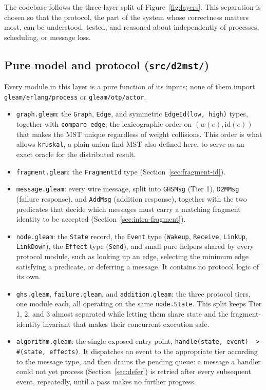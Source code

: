 The codebase follows the three-layer split of Figure~\ref{fig:layers}. This separation is
chosen so that the protocol, the part of the system whose correctness matters most, can be
understood, tested, and reasoned about independently of processes, scheduling, or message
loss.

\subsection{Pure model and protocol (\texttt{src/d2mst/})}

Every module in this layer is a pure function of its inputs; none of them import
\texttt{gleam/erlang/process} or \texttt{gleam/otp/actor}.

\begin{itemize}
  \item \texttt{graph.gleam}: the \texttt{Graph}, \texttt{Edge}, and symmetric
  \texttt{EdgeId(low, high)} types, together with \texttt{compare\_edge}, the
  lexicographic order on $(w(e), \mathrm{id}(e))$ that makes the MST unique regardless of
  weight collisions. This order is what allows \texttt{kruskal}, a plain union-find MST
  also defined here, to serve as an exact oracle for the distributed result.
  \item \texttt{fragment.gleam}: the \texttt{FragmentId} type (Section~\ref{sec:fragment-id}).
  \item \texttt{message.gleam}: every wire message, split into \texttt{GHSMsg} (Tier 1),
  \texttt{D2MMsg} (failure response), and \texttt{AddMsg} (addition response), together
  with the two predicates that decide which messages must carry a matching fragment
  identity to be accepted (Section~\ref{sec:intra-fragment}).
  \item \texttt{node.gleam}: the \texttt{State} record, the \texttt{Event} type
  (\texttt{Wakeup}, \texttt{Receive}, \texttt{LinkUp}, \texttt{LinkDown}), the
  \texttt{Effect} type (\texttt{Send}), and small pure helpers shared by every protocol
  module, such as looking up an edge, selecting the minimum edge satisfying a predicate,
  or deferring a message. It contains no protocol logic of its own.
  \item \texttt{ghs.gleam}, \texttt{failure.gleam}, and \texttt{addition.gleam}: the three
  protocol tiers, one module each, all operating on the same \texttt{node.State}. This
  split keeps Tier 1, 2, and 3 almost separated while letting them share state and the
  fragment-identity invariant that makes their concurrent execution safe.
  \item \texttt{algorithm.gleam}: the single exposed entry point,
  \texttt{handle(state, event) -> \#(state, effects)}. It dispatches an event to the
  appropriate tier according to the message type, and then drains the pending queue: a
  message a handler could not yet process (Section~\ref{sec:defer}) is retried after every
  subsequent event, repeatedly, until a pass makes no further progress.
\end{itemize}

